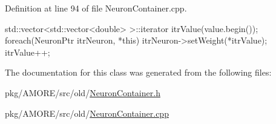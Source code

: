 Definition at line 94 of file NeuronContainer.cpp.


\begin{DoxyCode}
{
  std::vector<std::vector<double> >::iterator itrValue(value.begin());
foreach(NeuronPtr itrNeuron, *this)
  {
    itrNeuron->setWeight(*itrValue);
    itrValue++;
  }
}
\end{DoxyCode}


The documentation for this class was generated from the following files:\begin{DoxyCompactItemize}
\item 
pkg/AMORE/src/old/\hyperlink{_neuron_container_8h}{NeuronContainer.h}\item 
pkg/AMORE/src/old/\hyperlink{_neuron_container_8cpp}{NeuronContainer.cpp}\end{DoxyCompactItemize}
